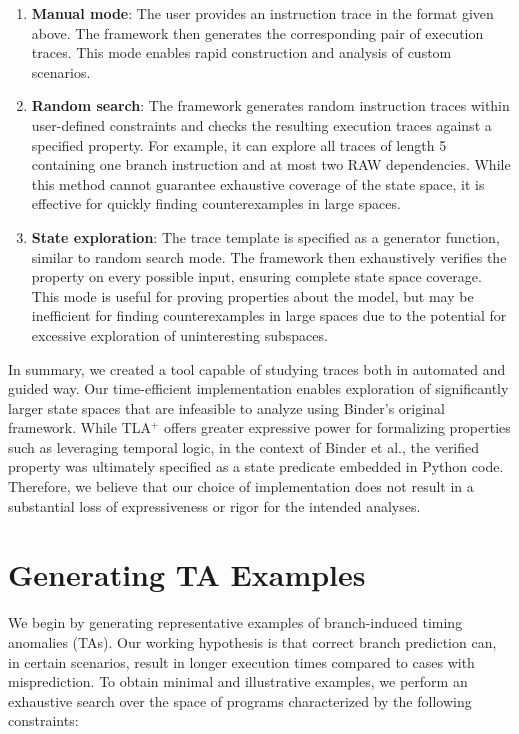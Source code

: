 \begin{enumerate}
	\item \textbf{Manual mode}: The user provides an instruction trace in the format given above. The framework then generates the corresponding pair of execution traces. This mode enables rapid construction and analysis of custom scenarios.
	\item \textbf{Random search}: The framework generates random instruction traces within user-defined constraints and checks the resulting execution traces against a specified property. For example, it can explore all traces of length 5 containing one branch instruction and at most two RAW dependencies. While this method cannot guarantee exhaustive coverage of the state space, it is effective for quickly finding counterexamples in large spaces.
	\item \textbf{State exploration}: The trace template is specified as a generator function, similar to random search mode. The framework then exhaustively verifies the property on every possible input, ensuring complete state space coverage. This mode is useful for proving properties about the model, but may be inefficient for finding counterexamples in large spaces due to the potential for excessive exploration of uninteresting subspaces.
\end{enumerate}


In summary, we created a tool capable of studying traces both in automated and guided way. Our time-efficient implementation enables exploration of significantly larger state spaces that are infeasible to analyze using Binder's original framework. While TLA$^+$ offers greater expressive power for formalizing properties such as leveraging temporal logic, in the context of Binder et al., the verified property was ultimately specified as a state predicate embedded in Python code. Therefore, we believe that our choice of implementation does not result in a substantial loss of expressiveness or rigor for the intended analyses.

\section{Generating TA Examples}

We begin by generating representative examples of branch-induced timing anomalies (TAs). Our working hypothesis is that correct branch prediction can, in certain scenarios, result in longer execution times compared to cases with misprediction. To obtain minimal and illustrative examples, we perform an exhaustive search over the space of programs characterized by the following constraints:

